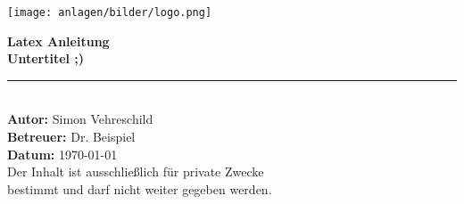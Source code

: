 \begin{titlepage}  %
    \centering
    \vspace*{0.5cm}  %

    \texttt{[image: anlagen/bilder/logo.png]}
    \vspace{1cm}  %

    {\Huge \textbf{Latex Anleitung}} \\[0.5cm]
    {\Large \textbf{Untertitel ;)}} \\[1.5cm]

    \rule{12cm}{0.5pt} \\[1.5cm]  %

    \textbf{\Large Autor:} \Large Simon Vehreschild \\[0.5cm]
    \textbf{\Large Betreuer:} \Large Dr. Beispiel \\[0.5cm]
    \textbf{\Large Datum:} \Large \today \\[3cm]

    {Der Inhalt ist ausschließlich für private Zwecke} \\
    {bestimmt und darf nicht weiter gegeben werden.} \\

    \vfill  %
\end{titlepage}